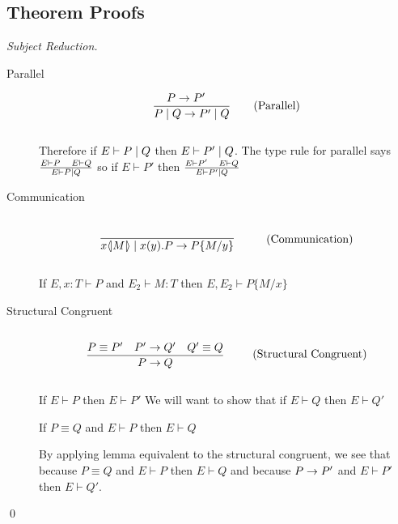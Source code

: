 \subsection{Theorem Proofs}
\begin{proof}[Subject Reduction]
	\begin{description}
	\item[Parallel]
		\begin{align*}
		\frac{P \rightarrow P' \quad}{P \mid Q \rightarrow P' \mid Q} \tag{Parallel}
		\end{align*}\\
		
		Therefore if $E \vdash P \mid Q$ then $E \vdash P' \mid Q$. The type rule for parallel says $\frac{E \vdash P\quad E \vdash Q}{E \vdash P \mid Q}$ so if $E \vdash P'$ then $\frac{E \vdash P' \quad E \vdash Q}{E \vdash P' \mid Q}$\\
	\item[Communication]
		\begin{align*}
		\infrule{}{\lift{x}{M}\para\inp{x}{y}P\ra P\{M/y\}} \tag{Communication}
		\end{align*}
		
		\begin{lemma}[Substitution]
			If $E,x:T \vdash P$ and $E_2 \vdash M:T$ then $E, E_2 \vdash P\{M/x \}$
		\end{lemma}
	\item[Structural Congruent]
		\begin{align*}
		\infrule{P \equiv P' \quad P' \ra Q' \quad Q' \equiv Q}{P \ra Q} \tag{Structural Congruent}
		\end{align*}
		
		
		If $E \vdash P$ then $E \vdash P'$ We will want to show that if $E \vdash Q$ then $E \vdash Q'$
		
		\begin{lemma}[Equivalent]
			If $P \equiv Q$ and $E \vdash P$ then $E \vdash Q$
		\end{lemma}
		
		By applying lemma equivalent to the structural congruent, we see that because $P \equiv Q$ and $E \vdash P$ then $E \vdash Q$ and because $P \rightarrow P'$ and $E \vdash P'$ then $E \vdash Q'$.
	\end{description}
	\qed
\end{proof}
\vspace{10mm}
